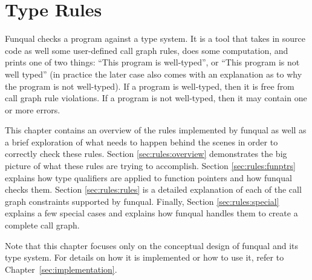 \chapter{Type Rules}\label{sec:rules}

Funqual checks a program against a type system.  It is a tool that takes in source code as well some user-defined call graph rules, does some computation, and prints one of two things: ``This program is well-typed'', or ``This program is not well typed'' (in practice the later case also comes with an explanation as to why the program is not well-typed).  If a program is well-typed, then it is free from call graph rule violations.  If a program is not well-typed, then it may contain one or more errors.

This chapter contains an overview of the rules implemented by funqual as well as a brief exploration of what needs to happen behind the scenes in order to correctly check these rules.  Section \ref{sec:rules:overview} demonstrates the big picture of what these rules are trying to accomplish.  Section \ref{sec:rules:funptrs} explains how type qualifiers are applied to function pointers and how funqual checks them.  Section \ref{sec:rules:rules} is a detailed explanation of each of the call graph constraints supported by funqual.  Finally, Section \ref{sec:rules:special} explains a few special cases and explains how funqual handles them to create a complete call graph.

Note that this chapter focuses only on the conceptual design of funqual and its type system.  For details on how it is implemented or how to use it, refer to \mbox{Chapter \ref{sec:implementation}}.








